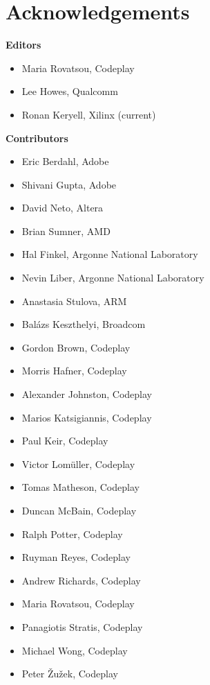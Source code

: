 \chapter{Acknowledgements}

\noindent\textbf{Editors}

\begin{itemize}
\item Maria Rovatsou, Codeplay
\item Lee Howes, Qualcomm
\item Ronan Keryell, Xilinx (current)
\end{itemize}


\noindent\textbf{Contributors}

\begin{multicols}{2}
\begin{itemize}
\item
    Eric Berdahl, Adobe
\item
    Shivani Gupta, Adobe
\item
    David Neto, Altera
\item
    Brian Sumner, AMD
\item
    Hal Finkel, Argonne National Laboratory
\item
    Nevin Liber, Argonne National Laboratory
\item
    Anastasia Stulova, ARM
\item
    Bal\'azs Keszthelyi, Broadcom
\item
    Gordon Brown, Codeplay
\item
    Morris Hafner, Codeplay
\item
    Alexander Johnston, Codeplay
\item
    Marios Katsigiannis, Codeplay
\item
    Paul Keir, Codeplay
\item
    Victor Lom\"uller, Codeplay
\item
    Tomas Matheson, Codeplay
\item
    Duncan McBain, Codeplay
\item
    Ralph Potter, Codeplay
\item
    Ruyman Reyes, Codeplay
\item
    Andrew Richards, Codeplay
\item
    Maria Rovatsou, Codeplay
\item
    Panagiotis Stratis, Codeplay
\item
    Michael Wong, Codeplay
\item
    Peter {\v Z}u{\v z}ek, Codeplay

\end{itemize}
\end{multicols}
